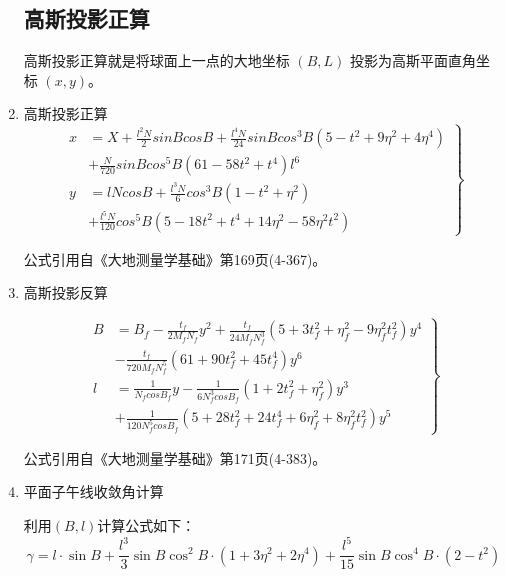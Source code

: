 \begin{enumerate}


\subsection{高斯投影正算}

高斯投影正算就是将球面上一点的大地坐标 $(B, L)$ 投影为高斯平面直角坐标 $(x, y)$。

\item 高斯投影正算
\begin{equation}
\left .
\begin{aligned}
x&=X+\frac{l^2 N}{2}sinBcosB +\frac{l^4 N}{24}sinBcos^3B(5-t^2 +9\eta^2+4\eta^4) \\
  &+\frac{N}{720}sinBcos^5 B(61-58t^2 +t^4)l^6  \\
y&=l N cosB+\frac{l^3 N}{6}cos^3 B(1-t^2 +\eta^2 ) \\
        &+\frac{l^5 N}{120}cos^5 B (5-18t^2+t^4 +14\eta^2 -58\eta^2t^2)
\end{aligned}
 \right \}
\end{equation}

公式引用自《大地测量学基础》第169页(4-367)。

\item 高斯投影反算

\begin{equation}
\left  .
\begin{aligned}
B&=B_f - \frac{t_f}{2M_f N_f }y^2 +\frac{t_f}{24 M_f N_f ^3}
(5 + 3t_f ^2  + \eta_f ^2 - 9\eta_f ^2 t_f^2)y^4 \\
 &- \frac{t_f}{720 M_f N_f ^5}(61 + 90t_f ^2 + 45t_f ^4)y^6 \\
l&=\frac{1}{N_f cosB_f}y - \frac{1}{6N_f ^3 cosB_f}(1 + 2t_f ^2 + \eta_f ^2)y^3  \\
 &+ \frac{1}{120N_f ^5 cosB_f}(5 + 28t_f ^2 + 24t_f ^4 + 6\eta_f ^2 +8\eta_f ^2 t_f ^2)y^5
\end{aligned} 
\right \}
\end{equation}

公式引用自《大地测量学基础》第171页(4-383)。


\item 平面子午线收敛角计算

利用$(B, l)$计算公式如下：
$$\gamma = l \cdot \sin B  + \frac{l^3}{3} \sin B \cos ^2 B \cdot (1 + 3 \eta^2 + 2 \eta^4)
+ \frac{ l^5}{15}\sin B \cos ^4 B \cdot (2 - t^2)$$


\end{enumerate}
